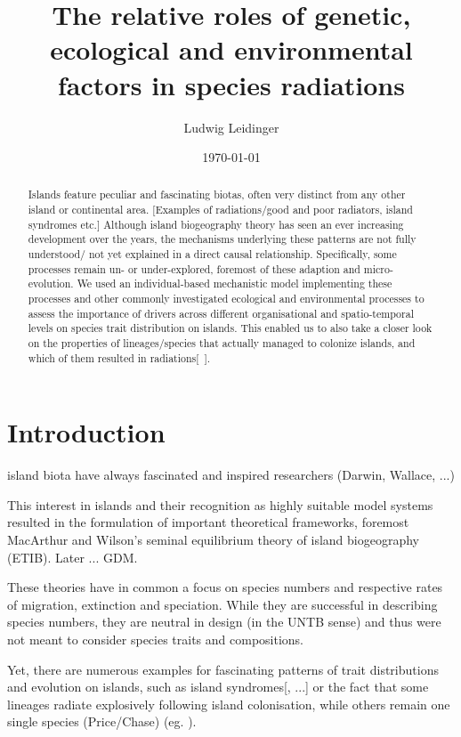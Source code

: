\documentclass[a4paper]{scrartcl}
\title{The relative roles of genetic, ecological and environmental factors in species radiations}
\author{Ludwig Leidinger}
\date{\today}
\begin{document}
\maketitle

\begin{abstract}
  Islands feature peculiar and fascinating biotas, often very distinct from any other island or continental area.
  [Examples of radiations/good and poor radiators, island syndromes etc.]
  Although island biogeography theory has seen an ever increasing development over the years,
  the mechanisms underlying these patterns are not fully understood/ not yet explained in a direct causal relationship.
  Specifically, some processes remain un- or under-explored, foremost of these adaption and micro-evolution.
  We used an individual-based mechanistic model implementing these processes and other commonly investigated ecological and
  environmental processes to assess the importance of drivers across different organisational and spatio-temporal levels
  on species trait distribution on islands.
  This enabled us to also take a closer look on the properties of lineages/species that actually managed to colonize islands,
  and which of them resulted in radiations[~].
  
  
\end{abstract}

\section{Introduction}
island biota have always fascinated and inspired researchers (Darwin, Wallace, ...)

This interest in islands and their recognition as highly suitable model systems resulted in the formulation of
important theoretical frameworks, foremost MacArthur and Wilson's seminal equilibrium theory of island biogeography (ETIB).
Later ... GDM.

These theories have in common a focus on species numbers and respective rates of migration, extinction and speciation.
While they are successful in describing species numbers, they are neutral in design (in the UNTB sense) and thus were not meant to consider species traits and compositions.

Yet, there are numerous examples for fascinating patterns of trait distributions and evolution on islands, such as island syndromes[, ...] or the fact that some lineages radiate explosively following
island colonisation, while others remain one single species (Price/Chase) (eg. \cite{price2004speciation}).
\end{document}
